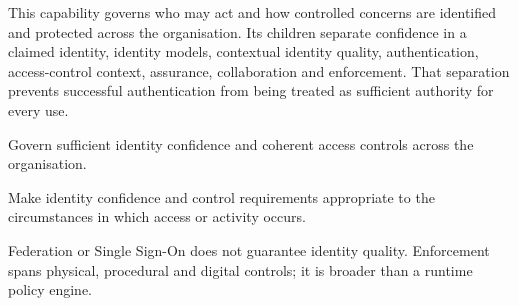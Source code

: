 This capability governs who may act and how controlled concerns are identified and protected across the organisation. Its children separate confidence in a claimed identity, identity models, contextual identity quality, authentication, access-control context, assurance, collaboration and enforcement. That separation prevents successful authentication from being treated as sufficient authority for every use.



Govern sufficient identity confidence and coherent access controls across the organisation.



Make identity confidence and control requirements appropriate to the circumstances in which access or activity occurs.



Federation or Single Sign-On does not guarantee identity quality. Enforcement spans physical, procedural and digital controls; it is broader than a runtime policy engine.



